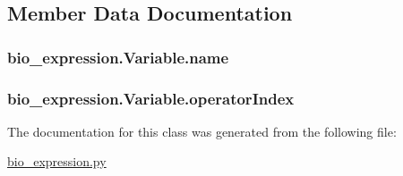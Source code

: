 \subsection{Member Data Documentation}
\hypertarget{classbio__expression_1_1_variable_a58b8146722379546bf5bce3c39b549cd}{
\subsubsection[{name}]{\setlength{\rightskip}{0pt plus 5cm}bio\+\_\+expression.\+Variable.\+name}}\label{classbio__expression_1_1_variable_a58b8146722379546bf5bce3c39b549cd}
\hypertarget{classbio__expression_1_1_variable_a5dd1818c0fe6bdb02a267a923aad2697}{
\subsubsection[{operator\+Index}]{\setlength{\rightskip}{0pt plus 5cm}bio\+\_\+expression.\+Variable.\+operator\+Index}}\label{classbio__expression_1_1_variable_a5dd1818c0fe6bdb02a267a923aad2697}


The documentation for this class was generated from the following file\+:\begin{DoxyCompactItemize}
\item 
\hyperlink{bio__expression_8py}{bio\+\_\+expression.\+py}\end{DoxyCompactItemize}
